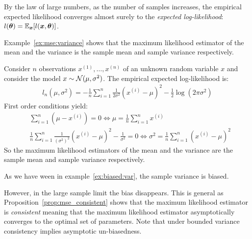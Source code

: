 By the law of large numbers, as the number of samples increases, the empirical
expected likelihood converges almost surely to the \emph{expected
  log-likelihood}: $l(\boldsymbol{\theta}) = \mathbb{E}_{\boldsymbol{x}}[l(\boldsymbol{x}, \boldsymbol{\theta})]$.

Example~\ref{ex:mse:variance} shows that the maximum likelihood estimator of the
mean and the variance is the sample mean and sample variance respectively.
\begin{example}
  \label{ex:mse:variance}
  Consider $n$ observations $x^{(1)}, \dots, x^{(n)}$ of an unknown random variable $x$
  and consider the model $x \sim \mathcal{N}(\mu, \sigma^2)$.
  The empirical expected log-likelihood is:
  \begin{align}
    l_n(\mu, \sigma^2) = -\frac1{n} \sum_{i=1}^n \frac1{2 \sigma^2}(x^{(i)} - \mu)^2 - \frac12 \log(2\pi \sigma^2)
  \end{align}
  First order conditions
  yield:
  \begin{align}
    &\sum_{i=1}^n (\mu - x^{(i)}) = 0 \iff \mu = \frac1{n} \sum_{i=1}^n x^{(i)} \\
    &\frac1{n} \sum_{i=1}^n \frac1{(\sigma^2)^2}(x^{(i)} - \mu)^2 - \frac1{\sigma^2} = 0 \iff \sigma^2 = \frac1{n} \sum_{i=1}^n(x^{(i)} - \mu)^2
  \end{align}
  So the maximum likelihood estimators of the mean and the variance are the
  sample mean and sample variance respectively.
\end{example}
As we have ween in example~\ref{ex:biased:var}, the sample variance is biased.

However, in the large sample limit the bias disappears. This is general as
Proposition~\ref{prop:mse_consistent} shows that the maximum likelihood
estimator is \emph{consistent} meaning that the maximum likelihood estimator
asymptotically converges to the optimal set of parameters. Note that under bounded variance consistency implies asymptotic un-biasedness.

